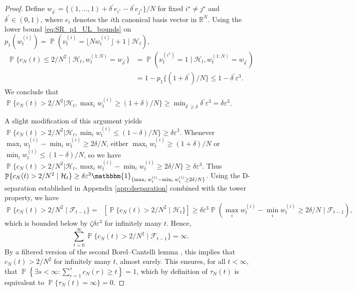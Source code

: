 \documentclass{article}
\theoremstyle{definition}
\DeclareMathOperator{\Prob}{\mathbb{P}}
\DeclareMathOperator{\Et}{\mathbb{E}_t}
\newcommand{\flnw}{\lfloor N w_t^{(i)} \rfloor}
\newcommand{\1}[1]{\mathbbm{1}_{\{#1\}}}
\begin{document}
\begin{proof}
Define $w_{\delta^\prime} = \{(1,\dots,1) + \delta^\prime e_{i^\star} - \delta^\prime e_{j^\star} \} /N$ for fixed $i^\star \neq j^\star$ and $\delta^\prime \in (0,1)$, where $e_i$ denotes the $i$th canonical basis vector in $\mathbb{R}^N$. 
Using the lower bound \eqref{eq:SR_p1_UL_bounds} on $p_1(w_t^{(i)}) = \Prob(\nu_t^{(i)} = \flnw +1 \mid \mathcal{H}_t)$,
\begin{align*}
\Prob\{ c_N(t) \leq 2/N^2 \mid \mathcal{H}_t, w_t^{(1:N)} = w_{\delta^\prime} \}
&= \Prob( \nu_t^{(i^\star)} = 1 \mid \mathcal{H}_t, w_t^{(1:N)} = w_{\delta^\prime} ) \\
&= 1-p_1\{ (1+\delta^\prime)/N \}
\leq 1- \delta^\prime \varepsilon^3 .
\end{align*}
We conclude that $\Prob\{ c_N(t) > 2/N^2 | \mathcal{H}_t, \max_i w_t^{(i)} \geq (1+\delta)/N \} \geq \min_{\delta^\prime \geq \delta} \delta^\prime\varepsilon^3 = \delta\varepsilon^3$.

A slight modification of this argument yields $\Prob\{ c_N(t) > 2/N^2 | \mathcal{H}_t, \min_i w_t^{(i)} \leq (1-\delta)/N \} \geq \delta\varepsilon^3$.
Whenever $\max_i w_t^{(i)} - \min_i w_t^{(i)} \geq 2\delta/N$, either $\max_i w_t^{(i)} \geq (1+\delta)/N$ or $\min_i w_t^{(i)} \leq (1-\delta)/N$, so we have 
$\Prob\{ c_N(t) > 2/N^2 | \mathcal{H}_t, \max_i w_t^{(i)} - \min_i w_t^{(i)} \geq 2\delta/N \} \geq \delta\varepsilon^3$.
Thus $ \Prob\{ c_N(t)>2/N^2 \mid \mathcal{H}_t \} \geq \delta\varepsilon^3 \1{\max_i w_t^{(i)} - \min_i w_t^{(i)} \geq 2\delta/N}$.
Using the D-separation established in Appendix \ref{app:dseparation} combined with the tower property, we have
\begin{equation*}
\Prob\{ c_N(t)>2/N^2 \mid \mathcal{F}_{t-1} \}
=\Et[ \Prob\{ c_N(t)>2/N^2 \mid \mathcal{H}_t \} ] 
\geq \delta\varepsilon^3 \Prob( \max_i w_t^{(i)} - \min_i w_t^{(i)} \geq 2\delta/N \mid \mathcal{F}_{t-1} ) ,
\end{equation*}
which is bounded below by $ \zeta \delta \varepsilon^3 $ for infinitely many $t$. 
Hence,
\begin{equation*}
\sum_{t=0}^\infty \Prob\{ c_N(t) > 2/N^2 \mid \mathcal{F}_{t-1} \} = \infty .
\end{equation*}
By a filtered version of the second Borel--Cantelli lemma \citep[see for example][Theorem 4.3.4]{durrett2019}, this implies that $c_N(t) >2/N^2$ for infinitely many $t$, almost surely.
This ensures, for all $t <\infty$, that $\Prob\left\{ \exists s<\infty : \sum_{r=1}^s c_N(r) \geq t \right\} =1$, which by definition of $\tau_N(t)$ is equivalent to $\Prob\{ \tau_N(t) = \infty \} =0$.
\end{proof}
\end{document}
